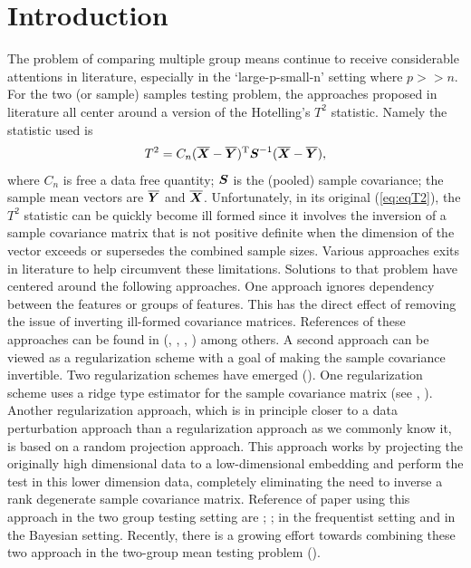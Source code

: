 \documentclass[times,sort&compress,3p]{elsarticle}
\theoremstyle{plain}%
\theoremstyle{definition}
\def\be{\begin{eqnarray}}
\def\ee{\end{eqnarray}}
\def\trans{^{\rm T}}
\newcommand{\uS}       {\mbox{\boldmath$S$}}
\newcommand{\uX}       {\mbox{\boldmath$X$}}
\newcommand{\uY}       {\mbox{\boldmath$Y$}}
\begin{document}
\section{Introduction} \label{sec:intro}
The problem of comparing multiple group means continue to receive considerable attentions in literature, especially in the ‘large-p-small-n’ setting where $p >> n$. For the two (or sample) samples testing problem, the approaches proposed in literature all center around a version of the Hotelling's $T^2$ statistic. Namely the statistic used is
\be
T^{2} = C_{n}(\overline{\uX} - \overline{\uY})\trans\uS^{-1} (\overline{\uX} - \overline{\uY}), \label{eq:eqT2}
\ee
where $C_{n}$ is free a data free quantity; $\uS$ is the (pooled) sample covariance; the sample mean vectors are $\overline{\uY}$ and $\overline{\uX}$.
Unfortunately, in its original (\ref{eq:eqT2}), the $T^2$ statistic can be quickly become ill formed since it involves the inversion of a sample covariance matrix that is not positive definite when the dimension of the vector exceeds or supersedes the combined sample sizes. Various approaches exits in literature to help circumvent these limitations. Solutions to that problem have centered around the following approaches. One approach ignores dependency between the features or groups of features. This has the direct effect of removing the issue of inverting ill-formed covariance matrices. References of these approaches can be found in (\citealp{bai1996effect}, \citealp{chen2010two}, \citealp{ahmad2014u}, \citealp{feng2017composite}) among others. A second approach can be viewed as a regularization scheme with a goal of making the sample covariance invertible. Two regularization schemes have emerged (\citealp{hu2020pairwise}). One regularization scheme uses a ridge type estimator for the sample covariance matrix (see \citealp{chen2011regularized}, \citealp{li2020adaptable}). Another regularization approach, which is in principle closer to a data perturbation approach than a regularization approach as we commonly know it, is based on a random projection approach. This approach works by projecting the originally high dimensional data to a low-dimensional embedding and perform the test in this lower dimension data, completely eliminating the need to inverse a rank degenerate sample covariance matrix. Reference of paper using this approach in the two group testing setting are \cite{lopes2011more}; \cite{thulin2014high}; \cite{srivastava2014raptt} in the frequentist setting and \cite{zoh2018powerful} in the Bayesian setting. Recently, there is a growing effort towards combining these two approach in the two-group mean testing problem (\citealp{hu2020pairwise}).
\end{document}
